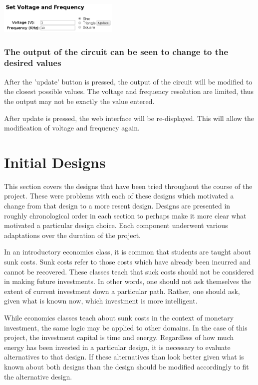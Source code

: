 \documentclass{article}	%
\begin{document}
\begin{multicols}{2}
\begin{center}
\includegraphics[width=0.43\textwidth,keepaspectratio]{web_interface_updating_values.png}
\end{center}

\subsubsection{The output of the circuit can be seen to change to the desired values}
After the 'update' button is pressed,
the output of the circuit will be modified
to the closest possible values.
The voltage and frequency resolution are limited,
thus the output may not be exactly the value entered.

After update is pressed,
the web interface will be re-displayed.
This will allow the modification of voltage and frequency again.

\newpage
\section{Initial Designs}
This section covers the designs that have been tried
throughout the course of the project. 
These were problems with each of these designs
which motivated a change from that design to
a more resent design.
Designs are presented in roughly chronological order in each section
to perhaps make it more clear what motivated
a particular design choice.
Each component underwent various adaptations 
over the duration of the project.

In an introductory economics class,
it is common that students are taught about sunk costs.
Sunk costs refer to those costs which
have already been incurred and
cannot be recovered.
These classes teach that suck costs should not
be considered in making future investments.
In other words,
one should not ask themselves the extent of 
current investment down a particular path.
Rather, one should ask,
given what is known now,
which investment is more intelligent.

While economics classes teach about sunk costs in
the context of monetary investment,
the same logic may be applied to other domains.
In the case of this project,
the investment capital is time and energy.
Regardless of how much energy has been invested
in a particular design,
it is necessary to evaluate alternatives to that design.
If these alternatives than look better
given what is known about both designs
than the design should be modified accordingly
to fit the alternative design.


\end{multicols}
\end{document}
